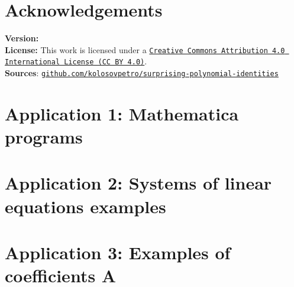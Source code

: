 \documentclass[12pt,letterpaper,oneside,reqno]{amsart}
\begin{document}
    \section*{Acknowledgements}
    

    
    

    \noindent \textbf{Version:} 
    \\[1em]
    \noindent \textbf{License:} This work is licensed under a
    \href{https://creativecommons.org/licenses/by/4.0/}
    {\texttt{Creative Commons Attribution 4.0 International License (CC BY 4.0)}}.
    \\[1em]
    \noindent \textbf{Sources}:
    \href{https://github.com/kolosovpetro/surprising-polynomial-identities-classical-interpolation}
    {\texttt{github.com/kolosovpetro/surprising-polynomial-identities}}

    \clearpage


    \section*{Application 1: Mathematica programs}
    


    \section*{Application 2: Systems of linear equations examples}
    


    \section*{Application 3: Examples of coefficients A}
    
\end{document}
